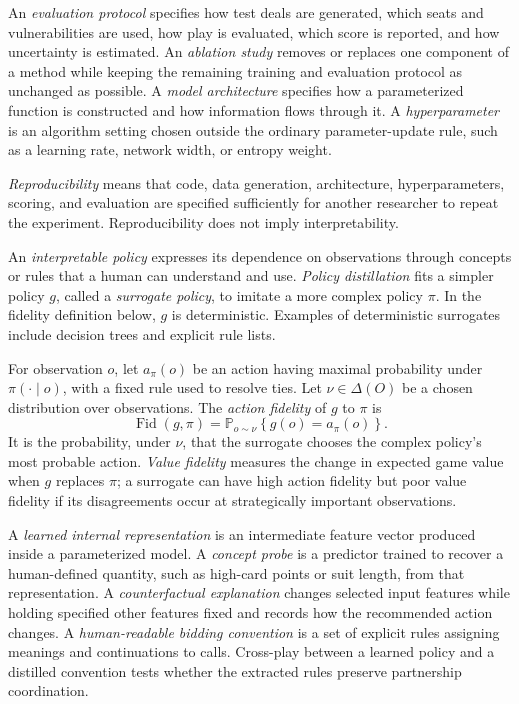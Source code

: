 An \emph{evaluation protocol} specifies how test deals are generated, which seats and vulnerabilities are used, how play is evaluated, which score is reported, and how uncertainty is estimated. An \emph{ablation study} removes or replaces one component of a method while keeping the remaining training and evaluation protocol as unchanged as possible. A \emph{model architecture} specifies how a parameterized function is constructed and how information flows through it. A \emph{hyperparameter} is an algorithm setting chosen outside the ordinary parameter-update rule, such as a learning rate, network width, or entropy weight.

\emph{Reproducibility} means that code, data generation, architecture, hyperparameters, scoring, and evaluation are specified sufficiently for another researcher to repeat the experiment. Reproducibility does not imply interpretability.

An \emph{interpretable policy} expresses its dependence on observations through concepts or rules that a human can understand and use. \emph{Policy distillation} fits a simpler policy $g$, called a \emph{surrogate policy}, to imitate a more complex policy $\pi$. In the fidelity definition below, $g$ is deterministic. Examples of deterministic surrogates include decision trees and explicit rule lists.

For observation $o$, let $a_\pi(o)$ be an action having maximal probability under $\pi(\cdot\mid o)$, with a fixed rule used to resolve ties. Let $\nu\in\Delta(O)$ be a chosen distribution over observations. The \emph{action fidelity} of $g$ to $\pi$ is
\[
    \operatorname{Fid}(g,\pi)
    =
    \mathbb{P}_{o\sim\nu}
    \left\{
      g(o)=a_\pi(o)
    \right\}.
\]
It is the probability, under $\nu$, that the surrogate chooses the complex policy's most probable action. \emph{Value fidelity} measures the change in expected game value when $g$ replaces $\pi$; a surrogate can have high action fidelity but poor value fidelity if its disagreements occur at strategically important observations.

A \emph{learned internal representation} is an intermediate feature vector produced inside a parameterized model. A \emph{concept probe} is a predictor trained to recover a human-defined quantity, such as high-card points or suit length, from that representation. A \emph{counterfactual explanation} changes selected input features while holding specified other features fixed and records how the recommended action changes. A \emph{human-readable bidding convention} is a set of explicit rules assigning meanings and continuations to calls. Cross-play between a learned policy and a distilled convention tests whether the extracted rules preserve partnership coordination.


